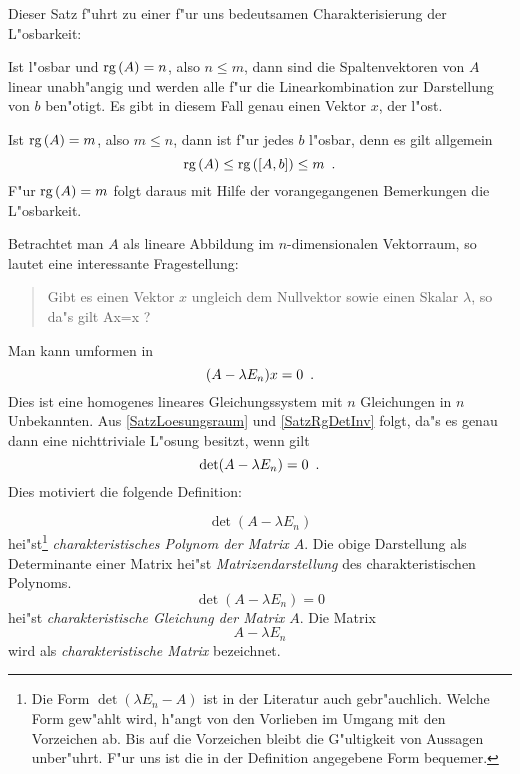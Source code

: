 Dieser Satz f"uhrt zu einer f"ur uns bedeutsamen Charakterisierung
der L"osbarkeit:

\begin{korollar}
\label{SatzGenauEine}
    Ist  l"osbar und $\mbox{\rm rg} \,(A) = n$,
    also $n \leq m$, dann sind die Spaltenvektoren von $A$
    linear unabh"angig
    und werden alle f"ur die Linearkombination zur Darstellung von $b$
    ben"otigt. Es gibt in diesem Fall genau einen Vektor $x$, der
     l"ost.
\end{korollar}

Ist $\mbox{\rm rg} \,(A) = m$, also $m \leq n$, dann ist  f"ur
jedes $b$ l"osbar, denn es gilt allgemein
\[ \mbox{\rm rg} \,(A) \leq \mbox{\rm rg} \,([A,b]) \leq m \mbox{\hspace{0.5em}.} \] F"ur $\mbox{\rm rg} \,(A) = m$ folgt
daraus mit Hilfe der vorangegangenen Bemerkungen die L"osbarkeit.



\label{ChapCharPoly}

Betrachtet \label{PageEigenMotiv}
man $A$ als lineare Abbildung im $n$-dimensionalen Vektorraum,
so lautet eine interessante Fragestellung:
\begin{quote}
    Gibt es einen Vektor $x$ ungleich dem Nullvektor sowie einen Skalar 
    $\lambda$, so da"s gilt
        Ax=\lambda x \mbox{\hspace{1em}?}
    \Eeq
\end{quote}
Man kann  umformen in
\[ (A - \lambda E_n)x = 0 \mbox{\hspace{0.5em}.} \] Dies ist eine homogenes lineares
Gleichungssystem mit $n$ Gleichungen in $n$ Unbekannten. 
Aus \ref{SatzLoesungsraum} und \ref{SatzRgDetInv} folgt, da"s es genau
dann eine nichttriviale L"osung besitzt, wenn gilt
\[ \det(A - \lambda E_n) = 0 \mbox{\hspace{0.5em}.} \]
Dies motiviert die folgende Definition:

\MyBeginDef
\label{DefCharPoly}
    \[ \det(A-\lambda E_n) \] hei"st\footnote{Die Form
    $\det(\lambda E_n - A)$ ist in der Literatur auch gebr"auchlich. Welche
    Form gew"ahlt wird, h"angt von den Vorlieben im Umgang mit den
    Vorzeichen ab. Bis auf die Vorzeichen bleibt die G"ultigkeit von
    Aussagen unber"uhrt. F"ur uns ist die in der Definition angegebene
    Form bequemer.} {\em charakteristisches Polynom der Matrix $A$}. Die
    obige Darstellung als Determinante einer Matrix 
    hei"st  
    {\em Matrizendarstellung} des charakteristischen Polynoms.
    \[ \det(A-\lambda E_n) = 0 \] hei"st {\em charakteristische Gleichung
    der Matrix $A$}.
    Die Matrix \[ A - \lambda E_n \] wird als 
    {\em charakteristische Matrix} 
    bezeichnet.
\MyEndDef

